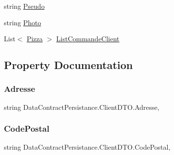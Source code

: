 \begin{DoxyCompactItemize}
\item 
string \hyperlink{classDataContractPersistance_1_1ClientDTO_a304eb927a8597ec5c7bfca96ad8b2ffe}{Pseudo}
\item 
string \hyperlink{classDataContractPersistance_1_1ClientDTO_a90ca72968c3310a3b88670ba7249c552}{Photo}
\item 
List$<$ \hyperlink{classModele_1_1Pizza}{Pizza} $>$ \hyperlink{classDataContractPersistance_1_1ClientDTO_af86b7075cf425100ec312275c490a460}{List\+Commande\+Client}
\end{DoxyCompactItemize}


\subsection{Property Documentation}
\mbox{\label{classDataContractPersistance_1_1ClientDTO_a4e81cef7a68a5db85cc01867eff01c76}} 
\subsubsection{\texorpdfstring{Adresse}{Adresse}}
{\footnotesize\ttfamily string Data\+Contract\+Persistance.\+Client\+D\+T\+O.\+Adresse\hspace{0.3cm}{\ttfamily [get]}, {\ttfamily [set]}}

\mbox{\label{classDataContractPersistance_1_1ClientDTO_afe9f8c6b5491a7ec7c602596bd0c21d8}} 
\subsubsection{\texorpdfstring{Code\+Postal}{CodePostal}}
{\footnotesize\ttfamily string Data\+Contract\+Persistance.\+Client\+D\+T\+O.\+Code\+Postal\hspace{0.3cm}{\ttfamily [get]}, {\ttfamily [set]}}


